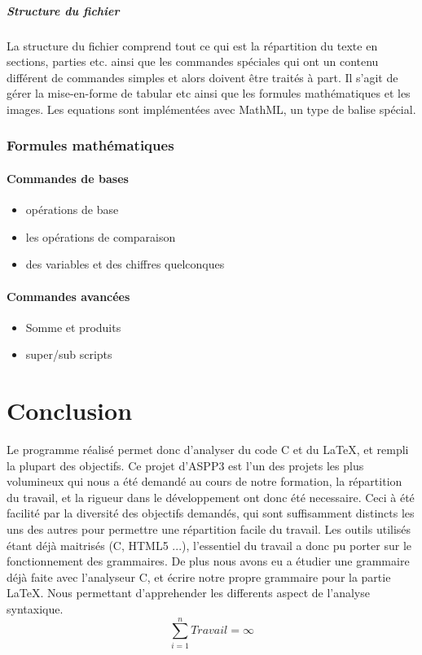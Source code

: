 \documentclass{report}
\begin{document}
{{ \subsubsection{Structure du fichier}{
La structure du fichier comprend tout ce qui est la répartition du texte en sections, parties etc. ainsi que les commandes spéciales qui ont un contenu différent de commandes simples et alors doivent être traités à part.
Il s'agit de gérer la mise-en-forme de tabular etc ainsi que les formules mathématiques et les images. Les equations sont implémentées avec MathML, un type de balise spécial.
}
}
}
\section{Formules mathématiques}
{
\subsection{Commandes de bases }{
\begin{itemize}
\item opérations de base
\item les opérations de comparaison
\item des variables et des chiffres quelconques
\end{itemize}
}
\subsection{Commandes avancées }{
\begin{itemize}
\item Somme et produits
\item super/sub scripts
\end{itemize}
}
}
\part{Conclusion}
Le programme réalisé permet donc d'analyser du code C et du LaTeX, et rempli la plupart des objectifs. Ce projet d'ASPP3 est l'un des projets les plus volumineux qui nous a été demandé au cours de notre formation, la répartition du travail, et la rigueur dans le développement ont donc été necessaire. Ceci à été facilité par la diversité des objectifs demandés, qui sont suffisamment distincts les uns des autres pour permettre une répartition facile du travail. Les outils utilisés étant déjà maitrisés (C, HTML5 ...), l'essentiel du travail a donc pu porter sur le fonctionnement des grammaires. De plus nous avons eu a étudier une grammaire déjà faite avec l'analyseur C, et écrire notre propre grammaire pour la partie LaTeX. Nous permettant d'apprehender les differents aspect de l'analyse syntaxique. 
\begin{equation}
{\sum_{i=1 }^{n} Travail = \infty} 
\end{equation}
\end{document}
